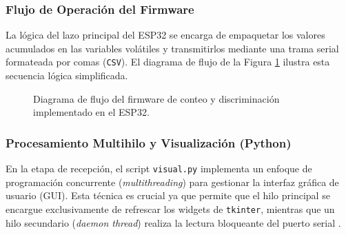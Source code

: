 \documentclass[conference]{IEEEtran}
\begin{document}
\subsubsection{Flujo de Operación del Firmware}
La lógica del lazo principal del ESP32 se encarga de empaquetar los valores acumulados en las variables volátiles y transmitirlos mediante una trama serial formateada por comas (\texttt{CSV}). El diagrama de flujo de la Figura \ref{fig:flow_ESP32} ilustra esta secuencia lógica simplificada.

\begin{figure}[htbp]
    \centering
    \caption{Diagrama de flujo del firmware de conteo y discriminación implementado en el ESP32.}
    \label{fig:flow_ESP32}
\end{figure}

\subsubsection{Procesamiento Multihilo y Visualización (Python)}
En la etapa de recepción, el script \texttt{visual.py} implementa un enfoque de programación concurrente (\textit{multithreading}) para gestionar la interfaz gráfica de usuario (GUI). Esta técnica es crucial ya que permite que el hilo principal se encargue exclusivamente de refrescar los widgets de \texttt{tkinter}, mientras que un hilo secundario (\textit{daemon thread}) realiza la lectura bloqueante del puerto serial \cite{sensores_20}.
\end{document}
